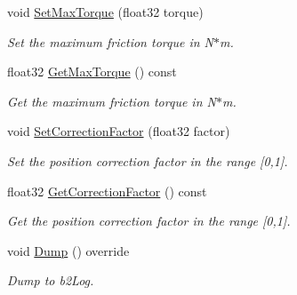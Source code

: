 \begin{DoxyCompactItemize}
void \hyperlink{classb2_motor_joint_a3e9a259d36c36e0dc078282e6799d625}{Set\+Max\+Torque} (float32 torque)
\begin{DoxyCompactList}\small\item\em Set the maximum friction torque in N$\ast$m. \end{DoxyCompactList}\item 
\mbox{\label{classb2_motor_joint_a40d4e4e852a6a722708f0c47b5c9fd69}} 
float32 \hyperlink{classb2_motor_joint_a40d4e4e852a6a722708f0c47b5c9fd69}{Get\+Max\+Torque} () const
\begin{DoxyCompactList}\small\item\em Get the maximum friction torque in N$\ast$m. \end{DoxyCompactList}\item 
\mbox{\label{classb2_motor_joint_ae59e624b8a7b6f869ab5e6148352cb52}} 
void \hyperlink{classb2_motor_joint_ae59e624b8a7b6f869ab5e6148352cb52}{Set\+Correction\+Factor} (float32 factor)
\begin{DoxyCompactList}\small\item\em Set the position correction factor in the range \mbox{[}0,1\mbox{]}. \end{DoxyCompactList}\item 
\mbox{\label{classb2_motor_joint_a429f9656d9f39e6e992de59c9620d6c6}} 
float32 \hyperlink{classb2_motor_joint_a429f9656d9f39e6e992de59c9620d6c6}{Get\+Correction\+Factor} () const
\begin{DoxyCompactList}\small\item\em Get the position correction factor in the range \mbox{[}0,1\mbox{]}. \end{DoxyCompactList}\item 
\mbox{\label{classb2_motor_joint_abb67754f39b4747ae07af5cb5b348836}} 
void \hyperlink{classb2_motor_joint_abb67754f39b4747ae07af5cb5b348836}{Dump} () override
\begin{DoxyCompactList}\small\item\em Dump to b2\+Log. \end{DoxyCompactList}\end{DoxyCompactItemize}
